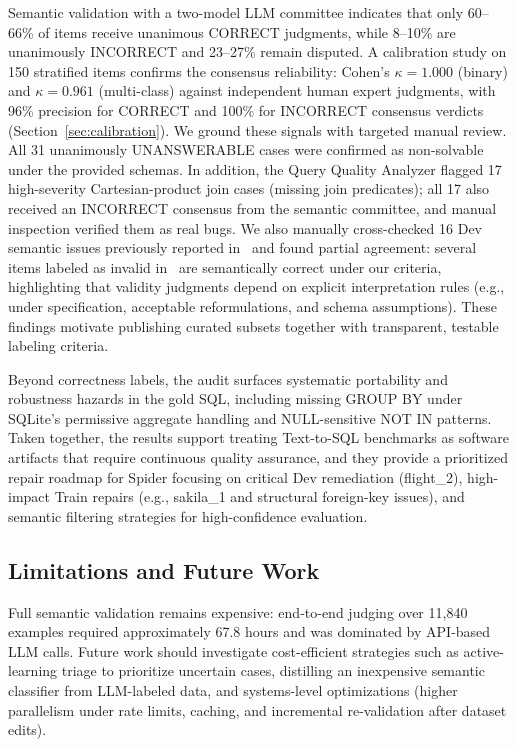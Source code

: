 \documentclass[]{einformatica}
\begin{document}
Semantic validation with a two-model LLM committee indicates that only 60--66\% of items receive unanimous CORRECT judgments, while 8--10\% are unanimously INCORRECT and 23--27\% remain disputed. A calibration study on 150 stratified items confirms the consensus reliability: Cohen's $\kappa = 1.000$ (binary) and $\kappa = 0.961$ (multi-class) against independent human expert judgments, with 96\% precision for CORRECT and 100\% for INCORRECT consensus verdicts (Section~\ref{sec:calibration}). We ground these signals with targeted manual review. All 31 unanimously UNANSWERABLE cases were confirmed as non-solvable under the provided schemas. In addition, the Query Quality Analyzer flagged 17 high-severity Cartesian-product join cases (missing join predicates); all 17 also received an INCORRECT consensus from the semantic committee, and manual inspection verified them as real bugs. We also manually cross-checked 16 Dev semantic issues previously reported in~\cite{liu2025nl2sqlbugs} and found partial agreement: several items labeled as invalid in~\cite{liu2025nl2sqlbugs} are semantically correct under our criteria, highlighting that validity judgments depend on explicit interpretation rules (e.g., under specification, acceptable reformulations, and schema assumptions). These findings motivate publishing curated subsets together with transparent, testable labeling criteria.

Beyond correctness labels, the audit surfaces systematic portability and robustness hazards in the gold SQL, including missing GROUP BY under SQLite's permissive aggregate handling and NULL-sensitive NOT IN patterns. Taken together, the results support treating Text-to-SQL benchmarks as software artifacts that require continuous quality assurance, and they provide a prioritized repair roadmap for Spider focusing on critical Dev remediation (flight\_2), high-impact Train repairs (e.g., sakila\_1 and structural foreign-key issues), and semantic filtering strategies for high-confidence evaluation.

\subsection{Limitations and Future Work}

Full semantic validation remains expensive: end-to-end judging over 11,840 examples required approximately 67.8 hours and was dominated by API-based LLM calls. Future work should investigate cost-efficient strategies such as active-learning triage to prioritize uncertain cases, distilling an inexpensive semantic classifier from LLM-labeled data, and systems-level optimizations (higher parallelism under rate limits, caching, and incremental re-validation after dataset edits). 
\end{document}
